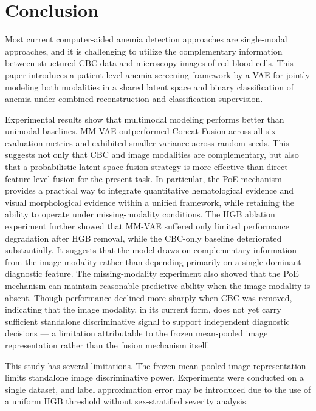 \documentclass[conference]{IEEEtran}
\begin{document}
\FloatBarrier

\section{Conclusion}

Most current computer-aided anemia detection approaches are single-modal approaches, and it is challenging to utilize the complementary information between structured CBC data and microscopy images of red blood cells. This paper introduces a patient-level anemia screening framework by a VAE for jointly modeling both modalities in a shared latent space and binary classification of anemia under combined reconstruction and classification supervision.

Experimental results show that multimodal modeling performs better than unimodal baselines. MM-VAE outperformed Concat Fusion across all six evaluation metrics and exhibited smaller variance across random seeds. This suggests not only that CBC and image modalities are complementary, but also that a probabilistic latent-space fusion strategy is more effective than direct feature-level fusion for the present task. In particular, the PoE mechanism provides a practical way to integrate quantitative hematological evidence and visual morphological evidence within a unified framework, while retaining the ability to operate under missing-modality conditions. The HGB ablation experiment further showed that MM-VAE suffered only limited performance degradation after HGB removal, while the CBC-only baseline deteriorated substantially. It suggests that the model draws on complementary information from the image modality rather than depending primarily on a single dominant diagnostic feature. The missing-modality experiment also showed that the PoE mechanism can maintain reasonable predictive ability when the image modality is absent. Though performance declined more sharply when CBC was removed, indicating that the image modality, in its current form, does not yet carry sufficient standalone discriminative signal to support independent diagnostic decisions --- a limitation attributable to the frozen mean-pooled image representation rather than the fusion mechanism itself.

This study has several limitations. The frozen mean-pooled image representation limits standalone image discriminative power. Experiments were conducted on a single dataset, and label approximation error may be introduced due to the use of a uniform HGB threshold without sex-stratified severity analysis.
\end{document}
